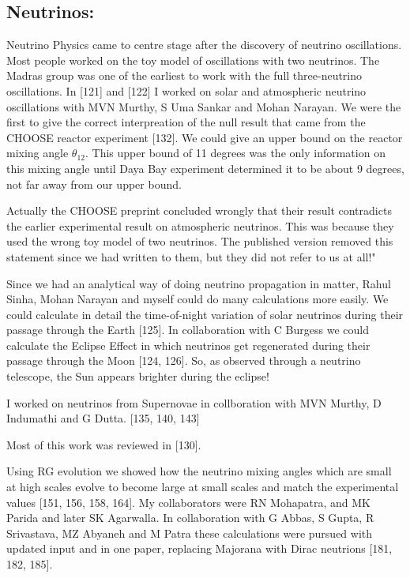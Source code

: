 \subsection*{Neutrinos: }

Neutrino Physics came to centre stage after the discovery of neutrino 
oscillations. Most people worked on the toy model of oscillations with 
two neutrinos. The Madras group was one of the earliest to work with the 
full three-neutrino oscillations. In [121] and [122] I worked on solar 
and atmospheric neutrino oscillations with MVN Murthy, S Uma Sankar and 
Mohan Narayan. We were the first to give the correct interpreation of 
the null result that came from the CHOOSE reactor experiment [132]. We 
could give an upper bound on the reactor mixing angle $\theta_{12}$. This 
upper bound of 11 degrees was the only information on this mixing angle 
until Daya Bay experiment determined it to be about 9 degrees, not 
far away from our upper bound.

Actually the CHOOSE preprint concluded wrongly that their result 
contradicts the earlier experimental result on atmospheric neutrinos. 
This was because they used the wrong toy model of two neutrinos. The 
published version removed this statement since we had written to them, 
but they did not refer to us at all!"

Since we had an analytical way of doing neutrino propagation in matter, 
Rahul Sinha, Mohan Narayan and myself could do many calculations more 
easily. We could calculate in detail the time-of-night variation of 
solar neutrinos during their passage through the Earth [125]. In 
collaboration with C Burgess we could calculate the Eclipse Effect in 
which neutrinos get regenerated during their passage through the Moon 
[124, 126]. So, as observed through a neutrino telescope, the Sun 
appears brighter during the eclipse!

I worked on neutrinos from Supernovae in collboration with MVN Murthy, D 
Indumathi and G Dutta. [135, 140, 143]

Most of this work was reviewed in [130].

Using RG evolution we showed how the neutrino mixing angles which are 
small at high scales evolve to become large at small scales and match 
the experimental values [151, 156, 158, 164]. My collaborators were RN 
Mohapatra, and MK Parida and later SK Agarwalla. In collaboration with G 
Abbas, S Gupta, R Srivastava, MZ Abyaneh and M Patra these calculations 
were pursued with updated input and in one paper, replacing Majorana with 
Dirac neutrions [181, 182, 185].

